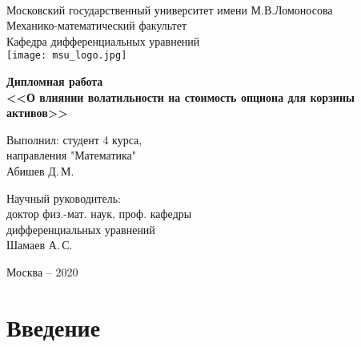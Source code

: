 \documentclass[a4paper, 12pt]{extreport}
\numberwithin{equation}{section}
\begin{document}
	\addto{}
	\renewcommand{\bibname}{{Список литературы}}
	\renewcommand{\contentsname}{Содержание}


\begin{titlepage}
	\begin{center}
		\small
		~\\[0.1cm]
		Московский государственный университет имени М.В.Ломоносова
		~\\[0.1cm]
		Механико-математический факультет
		~\\[0.1cm]
		Кафедра дифференциальных уравнений
		~\\[0.1cm]
		
		\texttt{[image: msu\_logo.jpg]}
		\normalsize
	\end{center}
	
	
	\vspace{1.5cm}
	\begin{center}
		\textbf{\large{Дипломная работа}}
		\\[0cm]
		\textbf{\large {<<О влиянии волатильности на стоимость опциона для корзины активов>>}}
		\\[4cm]
		\begin{normalsize}
			\begin{flushright}
				\small
				Выполнил: студент 4 курса,\\ направления "Математика" \\
				Абишев Д.\,М.
			\end{flushright}
			\normalsize
		\end{normalsize}
		
		\begin{normalsize}
			\begin{flushright}
				\small
				Научный руководитель:
				\\
				доктор физ.-мат. наук, проф. кафедры \\ дифференциальных уравнений\\
				Шамаев А.\,С.
			\end{flushright}
			\normalsize
		\end{normalsize}
		\vfill 
		
		\small{Москва -- 2020}
	\end{center} 
\end{titlepage}

	\setcounter{page}{2}
	\tableofcontents
	\thispagestyle{empty}
	\newpage
	\chapter{Введение}	
\end{document}
